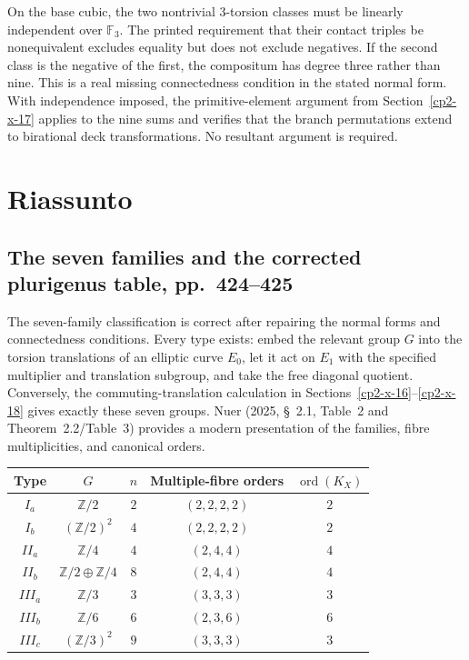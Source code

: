 On the base cubic, the two nontrivial $3$-torsion classes must be linearly independent over $\mathbb F_3$. The printed requirement that their contact triples be nonequivalent excludes equality but does not exclude negatives. If the second class is the negative of the first, the compositum has degree three rather than nine. This is a real missing connectedness condition in the stated normal form. With independence imposed, the primitive-element argument from Section~\ref{cp2-x-17} applies to the nine sums and verifies that the branch permutations extend to birational deck transformations. No resultant argument is required.

\section{Riassunto}
\label{cp2-x-19}

\subsection{The seven families and the corrected plurigenus table, pp.~424--425}

The seven-family classification is correct after repairing the normal forms and connectedness conditions. Every type exists: embed the relevant group $G$ into the torsion translations of an elliptic curve $E_0$, let it act on $E_1$ with the specified multiplier and translation subgroup, and take the free diagonal quotient. Conversely, the commuting-translation calculation in Sections~\ref{cp2-x-16}--\ref{cp2-x-18} gives exactly these seven groups. Nuer (2025, \S~2.1, Table~2 and Theorem~2.2/Table~3) provides a modern presentation of the families, fibre multiplicities, and canonical orders.

\begin{center}
\begin{tabular}{c c c c c}
Type & $G$ & $n$ & Multiple-fibre orders & $\operatorname{ord}(K_X)$\\
\hline
$I_a$ & $\mathbb Z/2$ & $2$ & $(2,2,2,2)$ & $2$\\
$I_b$ & $(\mathbb Z/2)^2$ & $4$ & $(2,2,2,2)$ & $2$\\
$II_a$ & $\mathbb Z/4$ & $4$ & $(2,4,4)$ & $4$\\
$II_b$ & $\mathbb Z/2\oplus\mathbb Z/4$ & $8$ & $(2,4,4)$ & $4$\\
$III_a$ & $\mathbb Z/3$ & $3$ & $(3,3,3)$ & $3$\\
$III_b$ & $\mathbb Z/6$ & $6$ & $(2,3,6)$ & $6$\\
$III_c$ & $(\mathbb Z/3)^2$ & $9$ & $(3,3,3)$ & $3$
\end{tabular}
\end{center}

